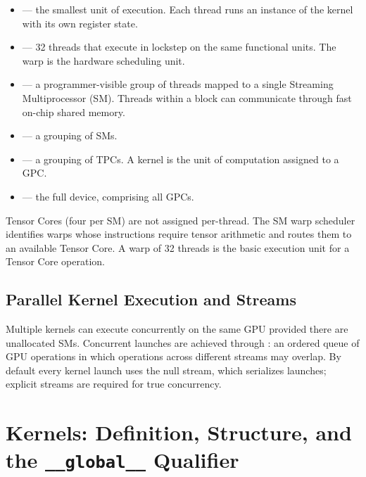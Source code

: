 \begin{itemize}
  \item {} --- the smallest unit of execution. Each thread runs
    an instance of the kernel with its own register state.
  \item {} --- 32 threads that execute in lockstep on the same
    functional units. The warp is the hardware scheduling unit.
  \item {} --- a programmer-visible group of threads
    mapped to a single Streaming Multiprocessor (SM). Threads within a block
    can communicate through fast on-chip shared memory.
  \item {} --- a grouping of SMs.
  \item {} --- a grouping of TPCs.
    A kernel is the unit of computation assigned to a GPC.
  \item {} --- the full device, comprising all GPCs.
\end{itemize}

\begin{ppnote}
Tensor Cores (four per SM) are not assigned per-thread. The SM warp scheduler
identifies warps whose instructions require tensor arithmetic and routes them
to an available Tensor Core. A warp of 32 threads is the basic execution unit
for a Tensor Core operation.
\end{ppnote}

\subsection{Parallel Kernel Execution and Streams}
\label{ssec:streams}

Multiple kernels can execute concurrently on the same GPU provided there are
unallocated SMs. Concurrent launches are achieved through :
an ordered queue of GPU operations in which operations across different streams
may overlap. By default every kernel launch uses the null stream, which
serializes launches; explicit streams are required for true concurrency.


\section{Kernels: Definition, Structure, and the \texttt{\_\_global\_\_} Qualifier}
\label{sec:kernels}


